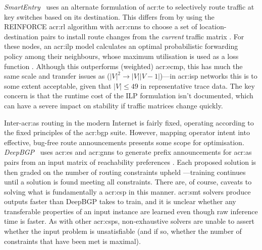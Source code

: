 \emph{SmartEntry}\littrace~\parencite{DBLP:conf/sigcomm/00010YC20} uses an alternate formulation of \gls{acr:te} to selectively route traffic at key switches based on its destination.
This differs from \citeauthor{DBLP:conf/hotnets/ValadarskySST17} by using the REINFORCE \gls{acr:rl} algorithm with \glspl{acr:cnn} to choose a set of location-destination pairs to install route changes \prllitact{} from the \emph{current} traffic matrix \prllitstate.
For these nodes, an \gls{acr:ilp} model calculates an optimal probabilistic forwarding policy among their neighbours, whose maximum utilisation is used as a loss function \prllitreward.
Although this outperforms (weighted) \gls{acr:ecmp}, this has much the same scale and transfer issues as \citeauthor{DBLP:conf/hotnets/ValadarskySST17} ($|V|^2\rightarrow|V||V-1|$)---in \gls{acr:isp} networks this is to some extent acceptable, given that $|V|\leq49$ in representative trace data.
The key concern is that the runtime cost of the ILP formulation isn't documented, which can have a severe impact on stability if traffic matrices change quickly.

Inter-\gls{acr:as} routing in the modern Internet is fairly fixed, operating according to the fixed principles of the \gls{acr:bgp} suite.
However, mapping operator intent into effective, bug-free route announcements presents some scope for optimisation.
\emph{DeepBGP}~\parencite{DBLP:conf/sigcomm/BahnasyLXC20} uses \gls{acr:es} and \glspl{acr:gnn} to generate prefix announcements for \gls{acr:as} pairs \prllitact{} from an input matrix of reachability preferences \prllitstate{}.
Each proposed solution is then graded on the number of routing constraints upheld \prllitreward{}---training continues until a solution is found meeting all constraints.
There are, of course, caveats to solving what is fundamentally a \gls{acr:csp} in this manner.
\gls{acr:smt} solvers produce outputs faster than DeepBGP takes to train, and it is unclear whether any transferable properties of an input instance are learned even though raw inference time is faster.
As with other \glspl{acr:csp}, non-exhaustive solvers are unable to assert whether the input problem is unsatisfiable (and if so, whether the number of constraints that have been met is maximal).

